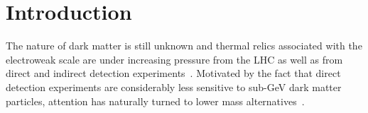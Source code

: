 \documentclass[notitlepage,letterpaper,natbib,aps,prd,onecolumn,amsmath,amsfonts,nofootinbib,preprintnumbers,superscriptaddress,secnumarabic,groupedaddress]{revtex4-1}
\begin{document}
\section{Introduction}\label{sec:intro}

The nature of dark matter is still unknown and thermal relics associated with the electroweak scale are under increasing pressure from the LHC as well as from direct and indirect detection experiments~\cite{Aaboud:2017phn,Sirunyan:2018xlo,Aprile:2018dbl,Akerib:2016vxi,Cui:2017nnn,Fermi-LAT:2016uux,Aghanim:2018eyx,Escudero:2016gzx,Arcadi:2017kky,Roszkowski:2017nbc,Athron:2017kgt,Arcadi:2019lka,Blanco:2019hah}. Motivated by the fact that direct detection experiments are considerably less sensitive to sub-GeV dark matter particles, attention has naturally turned to lower mass alternatives~\cite{Essig:2013lka,Alexander:2016aln,Battaglieri:2017aum,Beacham:2019nyx}. 
\end{document}
